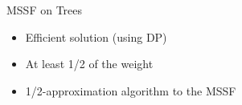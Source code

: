 \begin{frame}{MSSF on Trees}
\begin{itemize}
  \item Efficient solution (using DP)
  \item At least 1/2 of the weight
  \item 1/2-approximation algorithm to the MSSF 
\end{itemize}
\centering

\end{frame}